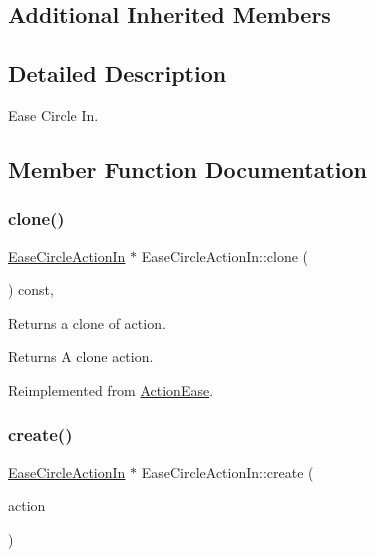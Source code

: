 \subsection*{Additional Inherited Members}


\subsection{Detailed Description}
Ease Circle In. 

\subsection{Member Function Documentation}
\mbox{\label{classEaseCircleActionIn_a5660f86732520e32f34649644ac716e6}} 
\subsubsection{\texorpdfstring{clone()}{clone()}}
{\footnotesize\ttfamily \hyperlink{classEaseCircleActionIn}{Ease\+Circle\+Action\+In} $\ast$ Ease\+Circle\+Action\+In\+::clone (\begin{DoxyParamCaption}\item[{void}]{ }\end{DoxyParamCaption}) const\hspace{0.3cm}{\ttfamily [override]}, {\ttfamily [virtual]}}

Returns a clone of action.

\begin{DoxyReturn}{Returns}
A clone action. 
\end{DoxyReturn}


Reimplemented from \hyperlink{classActionEase_a39bec93fe161fb732a74d8e51a2fe08b}{Action\+Ease}.

\mbox{\label{classEaseCircleActionIn_a56d06aeb50c566b47b4c0a15541e6c20}} 
\subsubsection{\texorpdfstring{create()}{create()}}
{\footnotesize\ttfamily \hyperlink{classEaseCircleActionIn}{Ease\+Circle\+Action\+In} $\ast$ Ease\+Circle\+Action\+In\+::create (\begin{DoxyParamCaption}\item[{\hyperlink{classActionInterval}{Action\+Interval} $\ast$}]{action }\end{DoxyParamCaption})\hspace{0.3cm}{\ttfamily [static]}}



